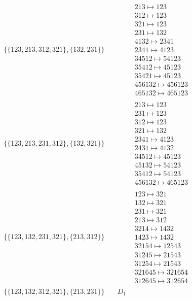 \begin{tiny}
\begin{align}
\begin{matrix}
\end{matrix}
\\
\{\{123, 213, 312, 321\}, \{132, 231\}\}
\quad
&
\phantom{.}
&
\begin{matrix}
213 \mapsto 123\\312 \mapsto 123\\321 \mapsto 123\\231 \mapsto 132\\4132 \mapsto 2341\\2341 \mapsto 4123\\34512 \mapsto 54123\\35412 \mapsto 45123\\35421 \mapsto 45123\\456132 \mapsto 456123\\465132 \mapsto 465123
\end{matrix}
\\
\{\{123, 213, 231, 312\}, \{132, 321\}\}
\quad
&
\phantom{.}
&
\begin{matrix}
213 \mapsto 123\\231 \mapsto 123\\312 \mapsto 123\\321 \mapsto 132\\2341 \mapsto 4123\\2431 \mapsto 4132\\34512 \mapsto 45123\\45132 \mapsto 54123\\35412 \mapsto 54123\\456132 \mapsto 465123
\end{matrix}
\\
\{\{123, 132, 231, 321\}, \{213, 312\}\}
\quad
&
\phantom{.}
&
\begin{matrix}
123 \mapsto 321\\132 \mapsto 321\\231 \mapsto 321\\213 \mapsto 312\\3214 \mapsto 1432\\1423 \mapsto 1432\\32154 \mapsto 12543\\31245 \mapsto 21543\\31254 \mapsto 21543\\321645 \mapsto 321654\\312645 \mapsto 312654
\end{matrix}
\\
\{\{123, 132, 312, 321\}, \{213, 231\}\}
\quad
&
D_1
&
\begin{matrix}

\end{matrix}
\end{align}
\end{tiny}
